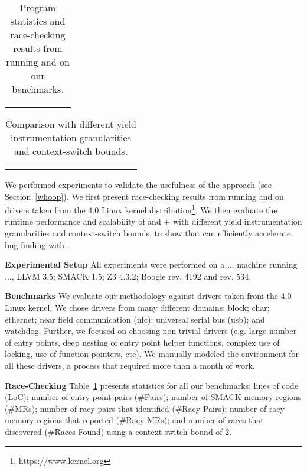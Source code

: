 \newcommand{\colspacing}{\hspace{1.8em}}
\begin{table}[t]
\small
\centering
\setlength{\tabcolsep}{0.3em}
\caption{Program statistics and race-checking results from running \whoop and \corral on our benchmarks.}
\label{tab:stats}
\begin{tabular}{l rrr rr r}
\centering

\end{tabular}
\end{table}

\begin{table*}[t]
\small
\centering
\setlength{\tabcolsep}{0.45em}
\caption{Comparison with different yield instrumentation granularities and context-switch bounds.}
\label{tab:results}
\begin{tabular}{l r rrrr rrrr rrrr}
\centering

\end{tabular}
\end{table*}

We performed experiments to validate the usefulness of the \whoop approach (see Section~\ref{whoop}). We first present race-checking results from running \whoop and \corral on \sizeOfBenchmarks drivers taken from the 4.0 Linux kernel distribution\footnote{https://www.kernel.org}. We then evaluate the runtime performance and scalability of \corral and \whoop + \corral with different yield instrumentation granularities and context-switch bounds, to show that \whoop can efficiently accelerate bug-finding with \corral.

\noindent
\textbf{Experimental Setup}\xspace\xspace All experiments were performed on a ... machine running ..., LLVM 3.5; SMACK 1.5; Z3 4.3.2; Boogie rev. 4192 and \corral rev. 534.

\noindent
\textbf{Benchmarks}\xspace\xspace We evaluate our methodology against \sizeOfBenchmarks drivers taken from the 4.0 Linux kernel. We chose drivers from many different domains: block; char; ethernet; near field communication (nfc); universal serial bus (usb); and watchdog. Further, we focused on choosing non-trivial drivers (e.g. large number of entry points, deep nesting of entry point helper functions, complex use of locking, use of function pointers, etc). We manually modeled the environment for all these drivers, a process that required more than a month of work.

\noindent
\textbf{Race-Checking}\xspace\xspace Table~\ref{tab:stats} presents statistics for all our benchmarks: lines of code (LoC); number of entry point pairs (\#Pairs); number of SMACK memory regions (\#MRs); number of racy pairs that \whoop identified (\#Racy Pairs); number of racy memory regions that \whoop reported (\#Racy MRs); and number of races that \corral discovered (\#Races Found) using a context-switch bound of 2.

